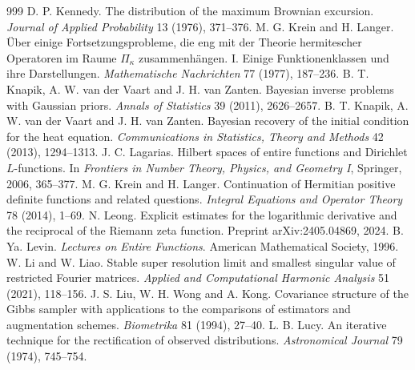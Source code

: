 \begin{thebibliography}{999}
 D. P. Kennedy. The distribution of the maximum Brownian excursion. \emph{Journal of Applied Probability} 13 (1976), 371--376.
 M. G. Krein and H. Langer. \"Uber einige Fortsetzungsprobleme, die eng mit der Theorie hermitescher Operatoren im Raume $\Pi_\kappa$ zusammenh\"angen. I. Einige Funktionenklassen und ihre Darstellungen. \emph{Mathematische Nachrichten} 77 (1977), 187--236.
 B. T. Knapik, A. W. van der Vaart and J. H. van Zanten. Bayesian inverse problems with Gaussian priors. \emph{Annals of Statistics} 39 (2011), 2626--2657.
 B. T. Knapik, A. W. van der Vaart and J. H. van Zanten. Bayesian recovery of the initial condition for the heat equation. \emph{Communications in Statistics, Theory and Methods} 42 (2013), 1294--1313.
 J. C. Lagarias. Hilbert spaces of entire functions and Dirichlet $L$-functions. In \emph{Frontiers in Number Theory, Physics, and Geometry I}, Springer, 2006, 365--377.
 M. G. Krein and H. Langer. Continuation of Hermitian positive definite functions and related questions. \emph{Integral Equations and Operator Theory} 78 (2014), 1--69.
 N. Leong. Explicit estimates for the logarithmic derivative and the reciprocal of the Riemann zeta function. Preprint arXiv:2405.04869, 2024.
 B. Ya. Levin. \emph{Lectures on Entire Functions}. American Mathematical Society, 1996.
 W. Li and W. Liao. Stable super resolution limit and smallest singular value of restricted Fourier matrices. \emph{Applied and Computational Harmonic Analysis} 51 (2021), 118--156.
 J. S. Liu, W. H. Wong and A. Kong. Covariance structure of the Gibbs sampler with applications to the comparisons of estimators and augmentation schemes. \emph{Biometrika} 81 (1994), 27--40.
 L. B. Lucy. An iterative technique for the rectification of observed distributions. \emph{Astronomical Journal} 79 (1974), 745--754.

\end{thebibliography}
